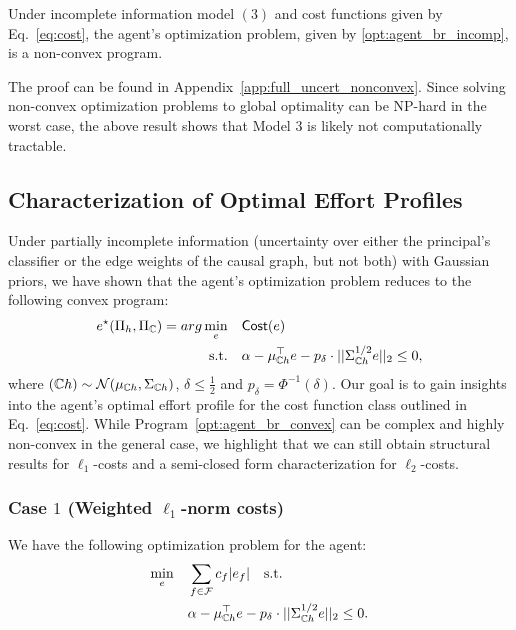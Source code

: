 \begin{prop}\label{prop:full_uncert_nonconvex}
Under incomplete information model $(3)$ and cost functions given by Eq.~\eqref{eq:cost}, the agent's optimization problem, given by \eqref{opt:agent_br_incomp}, is a non-convex program.
\end{prop}

The proof can be found in Appendix~\ref{app:full_uncert_nonconvex}. 
Since solving non-convex optimization problems to global optimality can be NP-hard in the worst case, the above result shows that Model $3$ is likely not computationally tractable. 

\subsection{Characterization of Optimal Effort Profiles}\label{subsec:incomp_effort}

Under partially incomplete information (uncertainty over either the principal's classifier or the edge weights of the causal graph, but not both) with Gaussian priors, we have shown that the agent's optimization problem reduces to the following convex program: 
\begin{align}\label{opt:agent_br_convex}
     e^{\star}(\Pi_h, \Pi_{\mathbb{C}}) = arg\min_{e} \quad &\textsf{Cost}(e) \\
     \text{s.t.} \quad &\alpha - \mu_{\mathbb{C} h}^{\top}e - p_{\delta}\cdot ||\Sigma_{\mathbb{C} h}^{1/2}e||_2 \leq 0, \nonumber
\end{align}
where $(\mathbb{C} h) \sim \mathcal{N}(\mu_{\mathbb{C} h}, \Sigma_{\mathbb{C} h})$, $\delta \leq \frac{1}{2}$ and $p_{\delta} = \Phi^{-1}(\delta)$. Our goal is to gain insights into the agent's optimal effort profile for the cost function class outlined in Eq.~\eqref{eq:cost}. While Program~\eqref{opt:agent_br_convex} can be complex and highly non-convex in the general case, we highlight that we can still obtain structural results for $\ell_1$-costs and a semi-closed form characterization for $\ell_2$-costs.


\subsubsection{Case $1$ (Weighted $\ell_1$-norm costs)}
We have the following optimization problem for the agent: 
\begin{align*}
    \min_{e} \quad &\sum_{f \in \mathcal{F}} c_f |e_f| \quad \text{s.t.}\\
    & \alpha - \mu_{\mathbb{C} h}^{\top}e - p_{\delta}\cdot ||\Sigma_{\mathbb{C} h}^{1/2}e||_2 \leq 0.
\end{align*}

